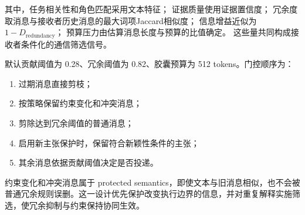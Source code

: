 其中，任务相关性和角色匹配采用文本特征；
证据质量使用证据置信度；
冗余度取消息与接收者历史消息的最大词项Jaccard相似度；
信息增益近似为$1-D_{\mathrm{redundancy}}$；
预算压力由估算消息长度与预算的比值确定。
这些量共同构成接收者条件化的通信筛选信号。


默认贡献阈值为 0.28、冗余阈值为 0.82、胶囊预算为 512 tokens。门控顺序为：

\begin{enumerate}
    \item 过期消息直接剪枝；
    \item 按策略保留约束变化和冲突消息；
    \item 剪除达到冗余阈值的普通消息；
    \item 启用新主张保护时，保留符合新颖性条件的主张；
    \item 其余消息依据贡献阈值决定是否投递。
\end{enumerate}

约束变化和冲突消息属于 protected semantics，即使文本与旧消息相似，也不会被普通冗余规则误删。这一设计优先保护改变执行边界的信息，并对重复解释实施筛选，使冗余抑制与约束保持协同生效。




